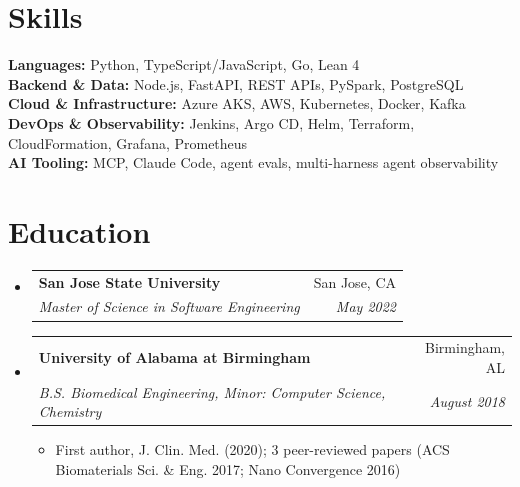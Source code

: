 \documentclass[letterpaper,11pt]{article}
\makeatletter
\newcommand{\resumeItem}[1]{\item\small{#1}}
\newcommand{\resumeSubheading}[4]{
  \item
  \begin{tabular*}{\textwidth}[t]{l@{\extracolsep{\fill}}r}
    \textbf{#1} & #2 \\
    \textit{\small#3} & \textit{\small #4} \\
  \end{tabular*}\vspace{-4pt}
}
\newcommand{\resumeSubHeadingListStart}{\begin{itemize}[leftmargin=0in, label={}]}
\newcommand{\resumeSubHeadingListEnd}{\end{itemize}}
\newcommand{\resumeItemListStart}{\begin{itemize}[leftmargin=0.15in]}
\newcommand{\resumeItemListEnd}{\end{itemize}\vspace{2pt}}
\makeatother
\begin{document}
\section{Skills}
\begin{itemize}[leftmargin=0in, label={}]
  \small{\item{
    \textbf{Languages:} Python, TypeScript/JavaScript, Go, Lean 4 \\[2pt]
    \textbf{Backend \& Data:} Node.js, FastAPI, REST APIs, PySpark, PostgreSQL \\[2pt]
    \textbf{Cloud \& Infrastructure:} Azure AKS, AWS, Kubernetes, Docker, Kafka \\[2pt]
    \textbf{DevOps \& Observability:} Jenkins, Argo CD, Helm, Terraform, CloudFormation, Grafana, Prometheus \\[2pt]
    \textbf{AI Tooling:} MCP, Claude Code, agent evals, multi-harness agent observability
  }}
\end{itemize}

\section{Education}
\resumeSubHeadingListStart

  \resumeSubheading
    {San Jose State University}{San Jose, CA}
    {Master of Science in Software Engineering}{May 2022}

  \resumeSubheading
    {University of Alabama at Birmingham}{Birmingham, AL}
    {B.S. Biomedical Engineering, Minor: Computer Science, Chemistry}{August 2018}
  \resumeItemListStart
    \resumeItem{First author, J. Clin. Med. (2020); 3 peer-reviewed papers (ACS Biomaterials Sci. \& Eng. 2017; Nano Convergence 2016)}
  \resumeItemListEnd

\resumeSubHeadingListEnd
\end{document}
